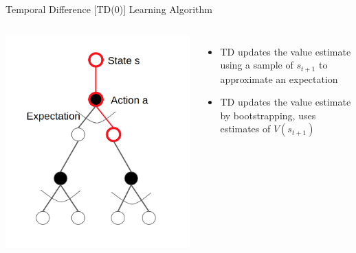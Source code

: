 \begin{frame}[c]{Temporal Difference [TD(0)] Learning Algorithm}

\begin{columns}
	
	
	\includegraphics[width=1.0\textwidth]{images/td0.png}
	
	
	\begin{itemize}
		\item TD updates the value estimate using a sample of $s_{t+1}$ to approximate an expectation
		\item TD updates the value estimate by bootstrapping, uses estimates of $V(s_{t+1})$
	\end{itemize}
	
	
\end{columns}	

\end{frame}

